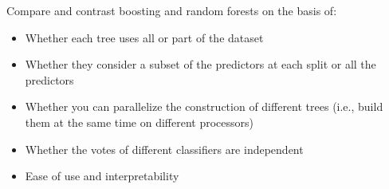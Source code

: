 \vspace{3mm}

\begin{question}{}
Compare and contrast boosting and random forests on the basis of:
\begin{itemize}
\item Whether each tree uses all or part of the dataset
\item Whether they consider a subset of the predictors at each split or all the predictors
\item Whether you can parallelize the construction of different trees (i.e., build them at the same time on different processors)
\item Whether the votes of different classifiers are independent
\item Ease of use and interpretability
\end{itemize}
\end{question}


